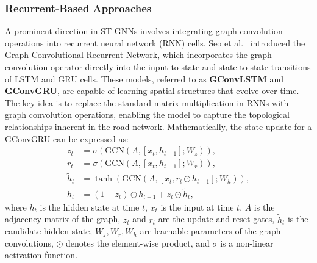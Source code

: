 \documentclass[11pt, a4paper]{article}
\begin{document}
\subsubsection{Recurrent-Based Approaches}
A prominent direction in ST-GNNs involves integrating graph convolution operations into recurrent neural network (RNN) cells. Seo et al.~\cite{seo_gcrn} introduced the Graph Convolutional Recurrent Network, which incorporates the graph convolution operator directly into the input-to-state and state-to-state transitions of LSTM and GRU cells. These models, referred to as \textbf{GConvLSTM} and \textbf{GConvGRU}, are capable of learning spatial structures that evolve over time. The key idea is to replace the standard matrix multiplication in RNNs with graph convolution operations, enabling the model to capture the topological relationships inherent in the road network. Mathematically, the state update for a GConvGRU can be expressed as:
\begin{align}
  z_t &= \sigma(\mathrm{GCN}(A,[x_t,h_{t-1}];W_z)), \\
  r_t &= \sigma(\mathrm{GCN}(A,[x_t,h_{t-1}];W_r)), \\
  \tilde{h}_t &= \tanh(\mathrm{GCN}(A,[x_t,r_t \odot h_{t-1}];W_h)), \\
  h_t &= (1 - z_t) \odot h_{t-1} + z_t \odot \tilde{h}_t,
\end{align}
where \( h_t \) is the hidden state at time \( t \), \( x_t \) is the input at time \( t \), \( A \) is the adjacency matrix of the graph, \( z_t \) and \( r_t \) are the update and reset gates, \( \tilde{h}_t \) is the candidate hidden state, \( W_z, W_r, W_h \) are learnable parameters of the graph convolutions, \( \odot \) denotes the element-wise product, and \( \sigma \) is a non-linear activation function.
\end{document}
